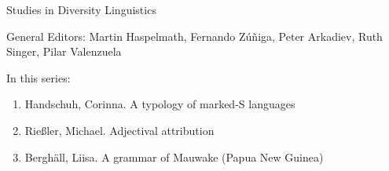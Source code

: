 
{\large Studies in Diversity Linguistics}

\bigskip

General Editors: Martin Haspelmath, Fernando Zúñiga, Peter Arkadiev, Ruth Singer, Pilar Valen­zuela

\bigskip

In this series:

\begin{enumerate}
\item Handschuh, Corinna. A typology of marked-S languages
\item Rießler, Michael. Adjectival attribution
\item Berghäll, Liisa. A grammar of Mauwake (Papua New Guinea)
\end{enumerate}


